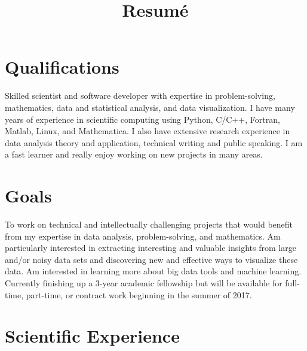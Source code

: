 \documentclass[11pt,letterpaper,sans]{moderncv} %
\title{Resum\'{e}}
\begin{document}
\makecvtitle %


\section{Qualifications}
\vspace{6pt}

Skilled scientist and software developer with expertise in problem-solving, mathematics, data and statistical analysis, and data visualization. I have many years of experience in scientific computing using Python, C/C++, Fortran, Matlab, Linux, and Mathematica. I also have extensive research experience in data analysis theory and application, technical writing and public speaking. I am a fast learner and really enjoy working on new projects in many areas.


\section{Goals}
\vspace{6pt}

To work on technical and intellectually challenging projects that would benefit from my expertise in data analysis, problem-solving, and mathematics. Am particularly interested in extracting interesting and valuable insights from large and/or noisy data sets and discovering new  and effective ways to visualize these data. Am interested in learning more about big data tools and machine learning. Currently finishing up a 3-year academic fellowship but will be available for full-time, part-time, or contract work beginning in the summer of 2017.


\section{Scientific Experience}
\vspace{6pt}
\end{document}
